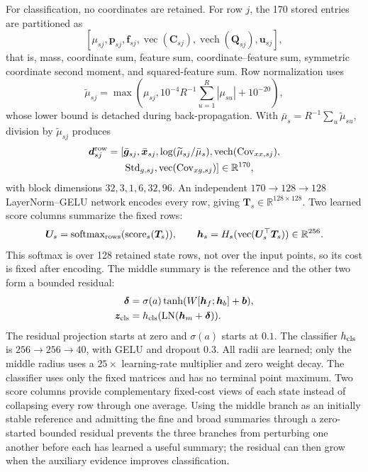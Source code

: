 \documentclass[11pt,a4paper]{article}
\newcommand{\R}{\mathbb{R}}
\newcommand{\vect}{\operatorname{vec}}
\begin{document}
For classification, no coordinates are retained. For row $j$, the 170 stored entries are partitioned as
\[
[\mu_{sj},\bm p_{sj},\bm f_{sj},\vect(\bm C_{sj}),
\operatorname{vech}(\bm Q_{sj}),\bm u_{sj}],
\]
that is, mass, coordinate sum, feature sum, coordinate--feature sum, symmetric coordinate second moment, and squared-feature sum. Row normalization uses
\begin{equation}
\widetilde\mu_{sj}=\max\!\left(
\mu_{sj},10^{-4}R^{-1}\sum_{u=1}^{R}|\mu_{su}|+10^{-20}\right),
\label{eq:cls-floor}
\end{equation}
whose lower bound is detached during back-propagation. With $\bar\mu_s=R^{-1}\sum_u\widetilde\mu_{su}$, division by $\widetilde\mu_{sj}$ produces
\begin{equation}
\begin{aligned}
\bm d^{\rm row}_{sj}=[&
\bar{\bm g}_{sj},\bar{\bm x}_{sj},
\log(\widetilde\mu_{sj}/\bar\mu_s),
\operatorname{vech}(\operatorname{Cov}_{xx,sj}),\\
&\operatorname{Std}_{g,sj},
\vect(\operatorname{Cov}_{xg,sj})]\in\R^{170},
\end{aligned}
\label{eq:cls-descriptor}
\end{equation}
with block dimensions $32,3,1,6,32,96$. An independent $170\rightarrow128\rightarrow128$ LayerNorm--GELU network encodes every row, giving $\bm T_s\in\R^{128\times128}$. Two learned score columns summarize the fixed rows:
\begin{equation}
\bm U_s=\operatorname{softmax}_{\rm rows}(\operatorname{score}_s(\bm T_s)),\qquad
\bm h_s=H_s(\vect(\bm U_s^\top\bm T_s))\in\R^{256}.
\label{eq:state-summary-main}
\end{equation}
This softmax is over 128 retained state rows, not over the input points, so its cost is fixed after encoding. The middle summary is the reference and the other two form a bounded residual:
\begin{align}
\bm\delta&=\sigma(a)\tanh(W[\bm h_f;\bm h_b]+\bm b),\nonumber\\
\bm z_{\rm cls}&=h_{\rm cls}(\operatorname{LN}(\bm h_m+\bm\delta)).
\label{eq:cls-main}
\end{align}
The residual projection starts at zero and $\sigma(a)$ starts at $0.1$. The classifier $h_{\rm cls}$ is $256\rightarrow256\rightarrow40$, with GELU and dropout $0.3$. All radii are learned; only the middle radius uses a $25\times$ learning-rate multiplier and zero weight decay. The classifier uses only the fixed matrices and has no terminal point maximum.
Two score columns provide complementary fixed-cost views of each state instead of collapsing every row through one average. Using the middle branch as an initially stable reference and admitting the fine and broad summaries through a zero-started bounded residual prevents the three branches from perturbing one another before each has learned a useful summary; the residual can then grow when the auxiliary evidence improves classification.
\end{document}
